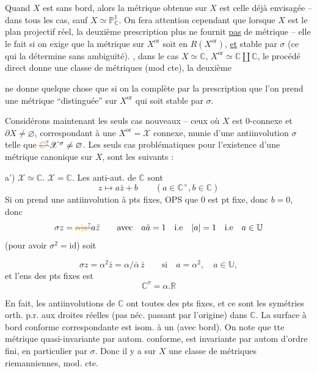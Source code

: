 Quand $X$ est sans bord,  alors  la métrique obtenue sur $X$ est celle déjà envisagée --  dans tous les cas, sauf $X\simeq\mathbb P^1_{\mathbb C}$. On fera attention cependant que lorsque $X$ est le plan projectif réel, la deuxième prescription  plus ne fournit \uline{pas} de métrique -- elle le fait si on exige que la métrique sur $X^{\mathrm{or}}$ soit en $R(X^{\mathrm{or}})$, \uline{et} stable par $\sigma$ (ce qui la détermine sans ambiguïté). , dans le cas $X\simeq\mathbb C$, $X^{\mathrm{or}}\simeq\mathbb C\amalg\mathbb C$, le procédé direct donne une classe de métriques (mod cte), la deuxième

ne donne quelque chose que si on la complète par la prescription que l'on prend une métrique ``distinguée'' sur $X^{\mathrm{or}}$ qui soit stable par $\sigma$.

Considérons maintenant les seuls cas nouveaux -- ceux où $X$ est 0-connexe et $\partial X\ne\varnothing$, correspondant à une $X^{\mathrm{or}}=\mathscr X$ connexe, munie d'une antiinvolution $\sigma$ telle que $\deleted{\unsure{\mathbb C}}\mathscr X^\sigma\ne\varnothing$. Les seuls cas problématiques pour l'existence d'une métrique canonique sur $X$, sont les suivants :

a') $\mathscr X\simeq\mathbb C$.  $\mathscr X=\mathbb C$. Les anti-aut. de $\mathbb C$ sont
\[
z\longmapsto a\bar z+b\qquad(a\in\mathbb C^{\times},b\in\mathbb C)
\]
Si on prend une antiinvolution à pts fixes, OPS que $0$ est pt fixe, donc $b=0$, donc 
\[
\sigma z=\deleted{\unsure{\alpha|a}}a\bar z\qquad\text{avec}\quad a\bar a=1\quad\text{i.e}\quad |a|=1\quad\text{i.e}\quad a\in\mathbb U
\]
(pour avoir $\sigma^2=\mathrm{id}$) soit

\[
\sigma z=\alpha^2\bar z=\alpha/\bar\alpha\,\bar z\qquad\text{si}\quad a=\alpha^2,\quad a\in\mathbb U,
\]
et l'ens des pts fixes est
\[
\mathbb C^\sigma=\alpha.\mathbb R
\]

En fait, les antiinvolutions de $\mathbb C$ ont toutes des pts fixes, et ce sont les symétries orth. p.r. aux droites réelles (pas néc. passant par l'origine) dans $\mathbb C$. La surface à bord conforme correspondante est isom. à un  (avec bord). On note que tte métrique  quasi-invariante par autom. conforme, est invariante par autom d'ordre fini, en particulier par $\sigma$. Donc il y a sur $X$ une classe  de métriques riemanniennes, mod. cte.

